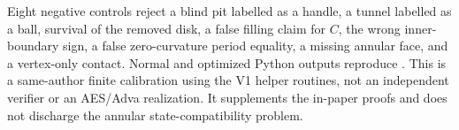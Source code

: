 Eight negative controls reject a blind pit labelled as a handle, a tunnel
labelled as a ball, survival of the removed disk, a false filling claim for
$C$, the wrong inner-boundary sign, a false zero-curvature period equality,
a missing annular face, and a vertex-only contact.  Normal and optimized Python
outputs reproduce .
This is a same-author finite calibration using the V1 helper routines, not an
independent verifier or an AES/Adva realization.  It supplements the in-paper
proofs and does not discharge the annular state-compatibility problem.

